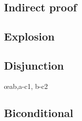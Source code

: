 \begin{multicols}{2}
\subsection*{Indirect proof}

\begin{fitchproof}
\open
	\AS
\close
{}
\end{fitchproof}


\subsection*{Explosion}

\begin{fitchproof}
\end{fitchproof}

\subsection*{Disjunction}

\begin{fitchproof}
\end{fitchproof}
\begin{fitchproof}
\end{fitchproof}
\begin{fitchproof}
	\open
		\AS
	\close
	\open
		\AS
	\close
	 \oe{ab,a-c1, b-c2}
\end{fitchproof}

\subsection*{Biconditional}

\begin{fitchproof}
	\open
		 \AS
	\close
	\open
		\AS
	\close
\end{fitchproof}
\begin{fitchproof}
	 
\end{fitchproof}
\begin{fitchproof}
	 
\end{fitchproof}

\end{multicols}

